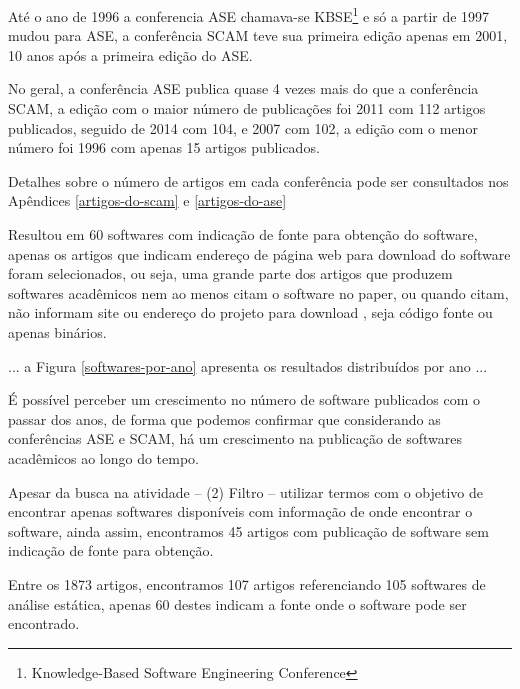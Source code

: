Até o ano de 1996 a conferencia ASE chamava-se KBSE\footnote{ Knowledge-Based
Software Engineering Conference} e só a partir de 1997 mudou para ASE, a
conferência SCAM teve sua primeira edição apenas em 2001, 10 anos após a
primeira edição do ASE.

No geral, a conferência ASE publica quase 4 vezes mais do que a conferência
SCAM, a edição com o maior número de publicações foi 2011 com 112 artigos
publicados, seguido de 2014 com 104, e 2007 com 102, a edição com o menor
número foi 1996 com apenas 15 artigos publicados.

Detalhes sobre o número de artigos
em cada conferência pode ser consultados nos Apêndices
\ref{artigos-do-scam} e \ref{artigos-do-ase} 



Resultou em 60 softwares com indicação de fonte para obtenção do
software, apenas os artigos que indicam endereço de página web para download do
software foram selecionados, ou seja, uma grande parte dos artigos que produzem
softwares acadêmicos nem ao menos citam o software no paper, ou quando citam,
não informam site ou endereço do projeto para download
\cite{allen2017engineering}, seja código fonte ou apenas binários.

... a Figura \ref{softwares-por-ano} apresenta os resultados distribuídos por ano ...

É possível perceber um crescimento no número de software publicados com o
passar dos anos, de forma que podemos confirmar que considerando as
conferências ASE e SCAM, há um crescimento na publicação de softwares
acadêmicos ao longo do tempo.

Apesar da busca na atividade -- (2) Filtro -- utilizar termos com o objetivo de
encontrar apenas softwares disponíveis com informação de onde encontrar o
software, ainda assim, encontramos 45 artigos com publicação de software sem
indicação de fonte para obtenção.

Entre os 1873 artigos, encontramos 107 artigos referenciando 105 softwares de
análise estática, apenas 60 destes indicam a fonte onde o software pode ser
encontrado.

